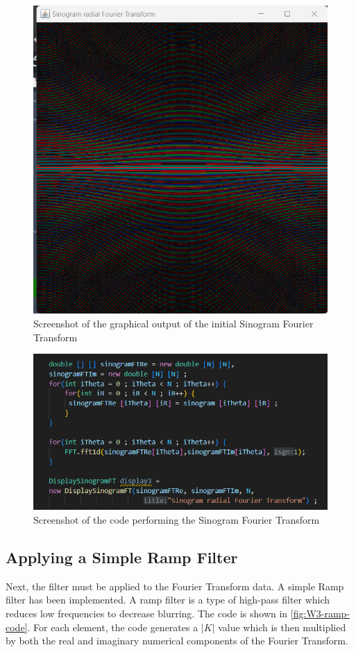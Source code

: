 \begin{figure}[H] 
    \centering
    \includegraphics[width=0.49\columnwidth]{Figures/Week 3/initial-FFTpng.png}
    \caption{Screenshot of the graphical output of the initial Sinogram Fourier Transform}
    \label{fig:W3-initial-FT}
\end{figure}
\begin{figure}[H] 
    \centering
    \includegraphics[width=0.9\columnwidth]{Figures/Week 3/initial-FFT-code.png}
    \caption{Screenshot of the code performing the Sinogram Fourier Transform}
    \label{fig:W3-initial-FT-code}
\end{figure}




\subsection{Applying a Simple Ramp Filter}
Next, the filter must be applied to the Fourier Transform data. A simple Ramp filter has been implemented. A ramp filter is a type of high-pass filter which reduces low frequencies to decrease blurring. The code is shown in \autoref{fig:W3-ramp-code}. For each element, the code generates a $|K|$ value which is then multiplied by both the real and imaginary numerical components of the Fourier Transform.


